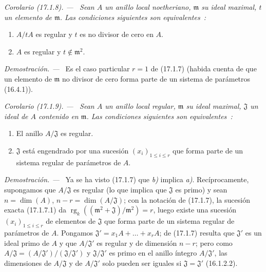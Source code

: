 \documentclass[10pt,oneside]{book}
\makeatletter
\newcommand{\setmanualcurrentlabel}[1]{\def\@currentlabel{#1}}
\newcommand{\oldpage}[2][]{%
  \setcounter{footnote}{0}%
  \marginpar{\scriptsize\textbf{#1}~|~#2}\ignorespaces}
\newenvironment{corollary}[1][]{%
  \setmanualcurrentlabel{#1}\par\medskip\noindent\itshape Corolario (#1). ---\ }{\par}
\newenvironment{proof}{%
  \par\medskip\noindent\textit{Demostración. ---\ }}{\par}
\makeatother
\begin{document}
\oldpage[0\textsubscript{IV-1}]{42}

\begin{corollary}[17.1.8]
\label{0.17.1.8-es}
Sean $A$ un anillo local noetheriano, $\mathfrak{m}$ su ideal maximal, $t$ un
elemento de $\mathfrak{m}$. Las condiciones siguientes son equivalentes~:
\begin{enumerate}
  \item[\rm a)] $A/tA$ es regular y $t$ es no divisor de cero en $A$.
  \item[\rm b)] $A$ es regular y $t\notin\mathfrak{m}^2$.
\end{enumerate}
\end{corollary}

\begin{proof}
Es el caso particular $r=1$ de (17.1.7) (habida cuenta de que un elemento de
$\mathfrak{m}$ no divisor de cero forma parte de un sistema de parámetros
(16.4.1)).
\end{proof}

\begin{corollary}[17.1.9]
\label{0.17.1.9-es}
Sean $A$ un anillo local regular, $\mathfrak{m}$ su ideal maximal,
$\mathfrak{J}$ un ideal de $A$ contenido en $\mathfrak{m}$. Las condiciones
siguientes son equivalentes~:
\begin{enumerate}
  \item[\rm a)] El anillo $A/\mathfrak{J}$ es regular.
  \item[\rm b)] $\mathfrak{J}$ está engendrado por una sucesión
  $(x_i)_{1\leq i\leq r}$ que forma parte de un sistema regular de parámetros
  de $A$.
\end{enumerate}
\end{corollary}

\begin{proof}
Ya se ha visto (17.1.7) que \emph{b)} implica \emph{a)}. Recíprocamente, supongamos que
$A/\mathfrak{J}$ es regular (lo que implica que $\mathfrak{J}$ es primo)
y sean $n=\dim(A)$, $n-r=\dim(A/\mathfrak{J})$; con la notación de
(17.1.7), la sucesión exacta (17.1.7.1) da
$\operatorname{rg}_k((\mathfrak{m}^2+\mathfrak{J})/\mathfrak{m}^2)=r$, luego
existe una sucesión $(x_i)_{1\leq i\leq r}$ de elementos de $\mathfrak{J}$ que
forma parte de un sistema regular de parámetros de $A$. Pongamos
$\mathfrak{J}'=x_1A+\ldots+x_rA$; de (17.1.7) resulta que $\mathfrak{J}'$
es un ideal primo de $A$ y que $A/\mathfrak{J}'$ es regular y de
dimensión $n-r$; pero como
$A/\mathfrak{J}=(A/\mathfrak{J}')/(\mathfrak{J}/\mathfrak{J}')$ y
$\mathfrak{J}/\mathfrak{J}'$ es primo en el anillo íntegro
$A/\mathfrak{J}'$, las dimensiones de $A/\mathfrak{J}$ y de
$A/\mathfrak{J}'$ solo pueden ser iguales si
$\mathfrak{J}=\mathfrak{J}'$ (16.1.2.2).
\end{proof}
\end{document}
